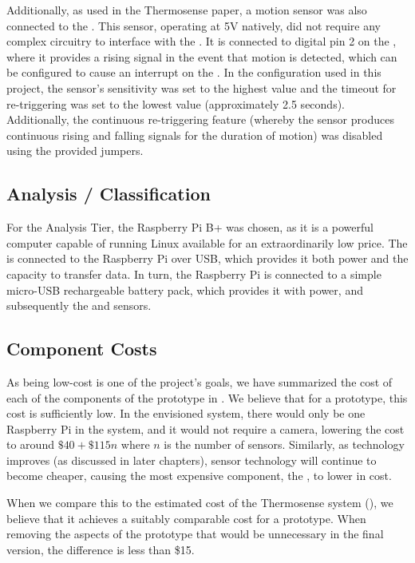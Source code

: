\documentclass[../thesis/thesis.tex]{subfiles}
\begin{document}
Additionally, as used in the Thermosense paper, a \pir motion sensor \cite{AdafruitPIR} was also connected to the \ard. This sensor, operating at 5V natively, did not require any complex circuitry to interface with the \ard. It is connected to digital pin 2 on the \ard, where it provides a rising signal in the event that motion is detected, which can be configured to cause an interrupt on the \ard. In the configuration used in this project, the sensor's sensitivity was set to the highest value and the timeout for re-triggering was set to the lowest value (approximately 2.5 seconds). Additionally, the continuous re-triggering feature (whereby the sensor produces continuous rising and falling signals for the duration of motion) was disabled using the provided jumpers. 

\subsection{Analysis / Classification}

For the Analysis Tier, the Raspberry Pi B+ was chosen, as it is a powerful computer capable of running Linux available for an extraordinarily low price. The \ard is connected to the Raspberry Pi over USB, which provides it both power and the capacity to transfer data. In turn, the Raspberry Pi is connected to a simple micro-USB rechargeable battery pack, which provides it with power, and subsequently the \ard and sensors.

\subsection{Component Costs}
\label{subsec:cost}
As being low-cost is one of the project's goals, we have summarized the cost of each of the components of the prototype in . We believe that for a prototype, this cost is sufficiently low. In the envisioned system, there would only be one Raspberry Pi in the system, and it would not require a camera, lowering the cost to around $\$40 + \$115n$ where $n$ is the number of sensors. Similarly, as technology improves (as discussed in later chapters), sensor technology will continue to become cheaper, causing the most expensive component, the \mlx, to lower in cost.

When we compare this to the estimated cost of the Thermosense system (), we believe that it achieves a suitably comparable cost for a prototype. When removing the aspects of the prototype that would be unnecessary in the final version, the difference is less than \$15.
\end{document}
